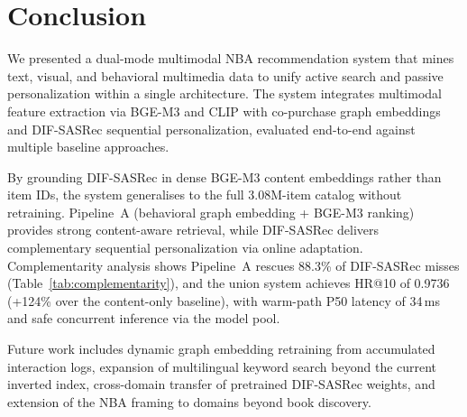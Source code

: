 \section{Conclusion}
\label{sec:conclusion}

We presented a dual-mode multimodal NBA recommendation system that mines
text, visual, and behavioral multimedia data to unify active search and
passive personalization within a single architecture.
The system integrates multimodal feature extraction via BGE-M3 and CLIP
with co-purchase graph embeddings and DIF-SASRec sequential personalization,
evaluated end-to-end against multiple baseline approaches.

By grounding DIF-SASRec in dense BGE-M3 content embeddings rather than
item IDs, the system generalises to the full 3.08M-item catalog without
retraining.
Pipeline~A (behavioral graph embedding + BGE-M3 ranking) provides strong
content-aware retrieval, while DIF-SASRec delivers complementary
sequential personalization via online adaptation.
Complementarity analysis shows Pipeline~A rescues 88.3\% of DIF-SASRec
misses (Table~\ref{tab:complementarity}), and the union system achieves HR@10 of 0.9736
(+124\% over the content-only baseline), with warm-path P50 latency of
34\,ms and safe concurrent inference via the model pool.

Future work includes dynamic graph embedding retraining from accumulated
interaction logs, expansion of multilingual keyword search beyond
the current inverted index, cross-domain transfer of pretrained
DIF-SASRec weights, and extension of the NBA framing to domains
beyond book discovery.
